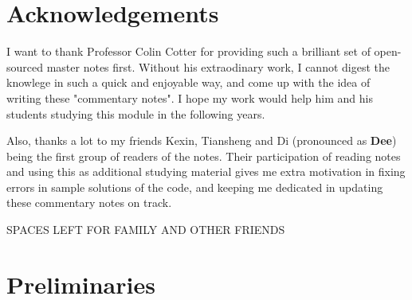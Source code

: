\documentclass[a4paper,12pt,twoside]{report}
\begin{document}
\chapter*{Acknowledgements}
I want to thank Professor Colin Cotter for providing such a brilliant set of open-sourced master notes first.
Without his extraodinary work, I cannot digest the knowlege in such a quick and enjoyable way, and come up with the idea of writing these "commentary notes". 
I hope my work would help him and his students studying this module in the following years.

\medskip
\noindent Also, thanks a lot to my friends Kexin, Tiansheng and Di (pronounced as \textbf{Dee}) being the first group of readers of the notes. Their participation of reading notes and using this as additional studying material gives me extra motivation in fixing errors in sample solutions of the code, and keeping me dedicated in updating these commentary notes on track.

\medskip
\noindent SPACES LEFT FOR FAMILY AND OTHER FRIENDS
\tableofcontents
\listoffigures

\chapter{Preliminaries}


% 

% 

% 

% 

% 
\end{document}
